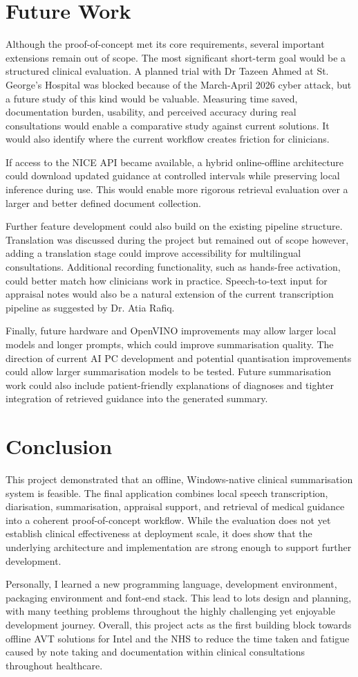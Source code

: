 \section{Future Work}
Although the proof-of-concept met its core requirements, several important extensions remain out of scope. The most significant short-term goal would be a structured clinical evaluation. A planned trial with Dr Tazeen Ahmed at St. George's Hospital was blocked because of the March-April 2026 cyber attack, but a future study of this kind would be valuable. Measuring time saved, documentation burden, usability, and perceived accuracy during real consultations would enable a comparative study against current solutions. It would also identify where the current workflow creates friction for clinicians.

If access to the NICE API became available, a hybrid online-offline architecture could download updated guidance at controlled intervals while preserving local inference during use. This would enable more rigorous retrieval evaluation over a larger and better defined document collection.

Further feature development could also build on the existing pipeline structure. Translation was discussed during the project but remained out of scope however, adding a translation stage could improve accessibility for multilingual consultations. Additional recording functionality, such as hands-free activation, could better match how clinicians work in practice. Speech-to-text input for appraisal notes would also be a natural extension of the current transcription pipeline as suggested by Dr. Atia Rafiq.

Finally, future hardware and OpenVINO improvements may allow larger local models and longer prompts, which could improve summarisation quality. The direction of current AI PC development and potential quantisation improvements could allow larger summarisation models to be tested. Future summarisation work could also include patient-friendly explanations of diagnoses and tighter integration of retrieved guidance into the generated summary.

\section{Conclusion}
This project demonstrated that an offline, Windows-native clinical summarisation system is feasible. The final application combines local speech transcription, diarisation, summarisation, appraisal support, and retrieval of medical guidance into a coherent proof-of-concept workflow. While the evaluation does not yet establish clinical effectiveness at deployment scale, it does show that the underlying architecture and implementation are strong enough to support further development.

Personally, I learned a new programming language, development environment, packaging environment and font-end stack. This lead to lots design and planning, with many teething problems throughout the highly challenging yet enjoyable development journey. Overall, this project acts as the first building block towards offline AVT solutions for Intel and the NHS to reduce the time taken and fatigue caused by note taking and documentation within clinical consultations throughout healthcare.